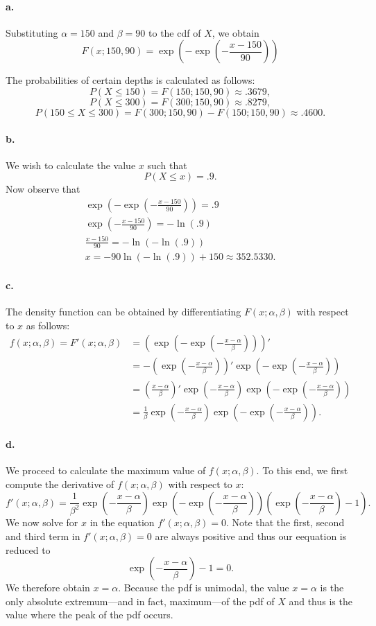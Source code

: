 \documentclass{exam}
\newcommand{\paren}[1]{\left(#1\right)}
\begin{document}
\paragraph{a.} Substituting $\alpha = 150$ and $\beta = 90$ to the cdf of $X$, we obtain
\[
	F(x; 150, 90) = \exp\paren{-\exp\paren{-\frac{x - 150}{90}}}
\]

The probabilities of certain depths is calculated as follows:
\[
	P(X \le 150) = F(150; 150, 90) \approx .3679,
\]
\[
	P(X \le 300) = F(300; 150, 90) \approx .8279,
\]
\[
	P(150 \le X \le 300) = F(300; 150, 90)- F(150; 150, 90) \approx .4600.
\]

\paragraph{b.} We wish to calculate the value $x$ such that
\[
	P(X \le x) = .9.
\]
Now observe that
\begin{gather*}
	\exp\paren{-\exp\paren{-\frac{x - 150}{90}}} = .9 \\
	\exp\paren{-\frac{x - 150}{90}} = -\ln(.9) \\
	\frac{x - 150}{90} = -\ln(-\ln(.9)) \\
	x = -90\ln(-\ln(.9)) + 150 \approx 352.5330.
\end{gather*}

\paragraph{c.} The density function can be obtained by differentiating $F(x; \alpha, \beta)$ with respect to $x$ as follows:
\begin{align*}
	f(x; \alpha, \beta) = F'(x; \alpha, \beta) &= \paren{\exp\paren{-\exp\paren{-\frac{x - \alpha}{\beta}}}}' \\
	&= -\paren{\exp\paren{-\frac{x - \alpha}{\beta}}}'\exp\paren{-\exp\paren{-\frac{x - \alpha}{\beta}}} \\
	&= \paren{\frac{x - \alpha}{\beta}}'\exp\paren{-\frac{x - \alpha}{\beta}}\exp\paren{-\exp\paren{-\frac{x - \alpha}{\beta}}} \\
	&= \frac1\beta\exp\paren{-\frac{x - \alpha}{\beta}}\exp\paren{-\exp\paren{-\frac{x - \alpha}{\beta}}}.
\end{align*}

\paragraph{d.} We proceed to calculate the maximum value of $f(x; \alpha, \beta)$. To this end, we first compute the derivative of $f(x; \alpha, \beta)$ with respect to $x$:
\[
	f'(x; \alpha, \beta) = \frac1{\beta^2} \exp\paren{-\frac{x - \alpha}{\beta}}\exp\paren{-\exp\paren{-\frac{x - \alpha}{\beta}}}\paren{\exp\paren{-\frac{x - \alpha}{\beta}} - 1}.
\]
We now solve for $x$ in the equation $f'(x; \alpha, \beta) = 0$. Note that the first, second and third term in $f'(x; \alpha, \beta) = 0$ are always positive and thus our eequation is reduced to
\[
	\exp\paren{-\frac{x - \alpha}{\beta}} - 1 = 0.
\]
We therefore obtain $x = \alpha$. Because the pdf is unimodal, the value $x = \alpha$ is the only absolute extremum---and in fact, maximum---of the pdf of $X$ and thus is the value where the peak of the pdf occurs.
\end{document}
